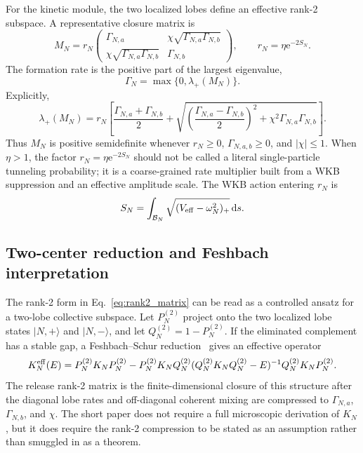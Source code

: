 \documentclass[aps,prd,onecolumn,notitlepage,nofootinbib,superscriptaddress,11pt,floatfix]{revtex4-2}
\newcommand{\dd}{\mathrm{d}}
\newcommand{\ee}{\mathrm{e}}
\begin{document}
For the kinetic module, the two localized lobes define an effective rank-2 subspace.
A representative closure matrix is
\begin{equation}
    M_N=r_N
    \begin{pmatrix}
        \Gamma_{N,a} & \chi\sqrt{\Gamma_{N,a}\Gamma_{N,b}}\\
        \chi\sqrt{\Gamma_{N,a}\Gamma_{N,b}} & \Gamma_{N,b}
    \end{pmatrix},
    \qquad r_N=\eta\ee^{-2S_N}.
    \label{eq:rank2_matrix}
\end{equation}
The formation rate is the positive part of the largest eigenvalue,
\begin{equation}
    \Gamma_N=\max\{0,\lambda_+(M_N)\}.
\end{equation}
Explicitly,
\begin{equation}
    \lambda_+(M_N)
    =
    r_N\left[
    \frac{\Gamma_{N,a}+\Gamma_{N,b}}{2}
    +
    \sqrt{
        \left(\frac{\Gamma_{N,a}-\Gamma_{N,b}}{2}\right)^2
        +
        \chi^2\Gamma_{N,a}\Gamma_{N,b}
    }
    \right].
    \label{eq:rank2_lamplus}
\end{equation}
Thus \(M_N\) is positive semidefinite whenever \(r_N\ge0\), \(\Gamma_{N,a,b}\ge0\), and \(|\chi|\le1\).
When \(\eta>1\), the factor \(r_N=\eta\ee^{-2S_N}\) should not be called a literal single-particle tunneling probability; it is a coarse-grained rate multiplier built from a WKB suppression and an effective amplitude scale.
The WKB action entering \(r_N\) is
\begin{equation}
    S_N=\int_{\mathcal B_N}\sqrt{(V_{\rm eff}-\omega_N^2)_+}\,\dd s.
    \label{eq:wkb_action}
\end{equation}

\subsection{Two-center reduction and Feshbach interpretation}

The rank-2 form in Eq.~\eqref{eq:rank2_matrix} can be read as a controlled ansatz for a two-lobe collective subspace.
Let \(P_N^{(2)}\) project onto the two localized lobe states \(|N,+\rangle\) and \(|N,-\rangle\), and let \(Q_N^{(2)}=1-P_N^{(2)}\).
If the eliminated complement has a stable gap, a Feshbach--Schur reduction~\cite{Feshbach1958} gives an effective operator
\begin{equation}
    K_N^{\rm eff}(E)
    =
    P_N^{(2)}K_NP_N^{(2)}
    -
    P_N^{(2)}K_NQ_N^{(2)}
    (Q_N^{(2)}K_NQ_N^{(2)}-E)^{-1}
    Q_N^{(2)}K_NP_N^{(2)}.
    \label{eq:feshbach_rank2}
\end{equation}
The release rank-2 matrix is the finite-dimensional closure of this structure after the diagonal lobe rates and off-diagonal coherent mixing are compressed to \(\Gamma_{N,a}\), \(\Gamma_{N,b}\), and \(\chi\).
The short paper does not require a full microscopic derivation of \(K_N\), but it does require the rank-2 compression to be stated as an assumption rather than smuggled in as a theorem.
\end{document}

